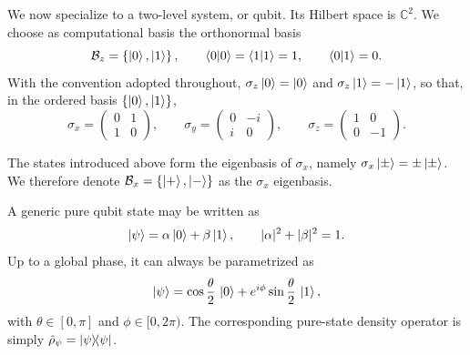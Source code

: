 We now specialize to a two-level system, or qubit. Its Hilbert space is $\mathds{C}^2$. We choose as computational basis the orthonormal basis
\begin{equation}
	\mathcal{B}_z=\left\{\ket{0},\ket{1}\right\},
	\qquad
	\braket{0}{0}=\braket{1}{1}=1,
	\qquad
	\braket{0}{1}=0.
	\label{eq:intro_qm_computational_basis}
\end{equation}
With the convention adopted throughout, $\sigma_z\ket{0}=\ket{0}$ and $\sigma_z\ket{1}=-\ket{1}$, so that, in the ordered basis $\{\ket{0},\ket{1}\}$,
\begin{equation}
	\sigma_x=
	\begin{pmatrix}
		0 & 1 \\
		1 & 0
	\end{pmatrix},
	\qquad
	\sigma_y=
	\begin{pmatrix}
		0 & -i \\
		i & 0
	\end{pmatrix},
	\qquad
	\sigma_z=
	\begin{pmatrix}
		1 & 0 \\
		0 & -1
	\end{pmatrix}.
	\label{eq:intro_qm_pauli_matrices_standard_convention}
\end{equation}

The states introduced above form the eigenbasis of $\sigma_x$, namely $\sigma_x\ket{\pm}=\pm\ket{\pm}$. We therefore denote $\mathcal{B}_x=\left\{\ket{+},\ket{-}\right\}$ as the $\sigma_x$ eigenbasis.

A generic pure qubit state may be written as
\begin{equation}
	\ket{\psi}=\alpha\ket{0}+\beta\ket{1},
	\qquad
	|\alpha|^2+|\beta|^2=1.
	\label{eq:intro_qm_generic_qubit_state}
\end{equation}
Up to a global phase, it can always be parametrized as
\begin{equation}
	\ket{\psi}
	=
	\cos\frac{\theta}{2}\,\ket{0}
	+
	e^{i\phi}\sin\frac{\theta}{2}\,\ket{1},
	\label{eq:intro_qm_qubit_state_bloch_parametrization}
\end{equation}
with $\theta\in[0,\pi]$ and $\phi\in[0,2\pi)$. The corresponding pure-state density operator is simply $\hat \rho_\psi=\dyad{\psi}{\psi}$.

